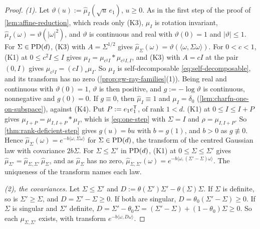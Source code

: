 \begin{proof}
\leanok
\emph{(1).} Let $\vartheta(u) := \widehat\mu_I(\sqrt u\,e_1)$, $u \ge 0$. As in the first step of the proof of
\ref{lem:affine-reduction}, which reads only (K3), $\mu_I$ is rotation invariant,
$\widehat\mu_I(\omega) = \vartheta(|\omega|^2)$, and $\vartheta$ is continuous and real with $\vartheta(0) = 1$
and $|\vartheta| \le 1$. For $\Sigma \in \mathrm{PD}(d)$, (K3) with $A = \Sigma^{1/2}$ gives
$\widehat\mu_\Sigma(\omega) = \vartheta(\langle\omega,\Sigma\omega\rangle)$. For $0 < c < 1$, (K1) at
$0 \le c^2I \le I$ gives $\mu_I = \mu_{c^2I} * \mu_{c^2I,I}$, and (K3) with $A = cI$ at the pair $(0, I)$
gives $\mu_{c^2I} = (cI)_*\mu_I$. So $\mu_I$ is self-decomposable \ref{eq:self-decomposable}, and its
transform has no zero (\ref{prop:gw-ray-families}(1)). Being real and continuous with $\vartheta(0) = 1$,
$\vartheta$ is then positive, and $g := -\log\vartheta$ is continuous, nonnegative and $g(0) = 0$. If
$g \equiv 0$, then $\widehat\mu_I \equiv 1$ and $\mu_I = \delta_0$ (\ref{lem:charfn-one-on-subspace}), against
(K4). Put $P := e_1e_1^{\mathsf{T}}$, of rank $1 < d$. (K1) at $0 \le I \le I + P$ gives
$\mu_{I+P} = \mu_{I,I+P} * \mu_I$, which is \ref{eq:one-step} with $\Sigma = I$ and $\rho = \mu_{I,I+P}$. So
\ref{thm:rank-deficient-step} gives $g(u) = bu$ with $b = g(1)$, and $b > 0$ as $g \not\equiv 0$. Hence
$\widehat\mu_\Sigma(\omega) = e^{-b\langle\omega,\Sigma\omega\rangle}$ for $\Sigma \in \mathrm{PD}(d)$, the transform of
the centred Gaussian law with covariance $2b\Sigma$. For $\Sigma \le \Sigma'$ in $\mathrm{PD}(d)$, (K1) at
$0 \le \Sigma \le \Sigma'$ gives $\widehat\mu_{\Sigma'} = \widehat\mu_{\Sigma,\Sigma'}\,\widehat\mu_\Sigma$, and as
$\widehat\mu_\Sigma$ has no zero, $\widehat\mu_{\Sigma,\Sigma'}(\omega) = e^{-b\langle\omega,(\Sigma'-\Sigma)\omega\rangle}$.
The uniqueness of the transform names each law.

\emph{(2), the covariances.} Let $\Sigma \le \Sigma'$ and $D := \theta(\Sigma')\Sigma' - \theta(\Sigma)\Sigma$. If
$\Sigma$ is definite, so is $\Sigma' \ge \Sigma$, and $D = \Sigma' - \Sigma \ge 0$. If both are singular,
$D = \theta_0(\Sigma' - \Sigma) \ge 0$. If $\Sigma$ is singular and $\Sigma'$ definite,
$D = \Sigma' - \theta_0\Sigma = (\Sigma' - \Sigma) + (1 - \theta_0)\Sigma \ge 0$. So each $\mu_{\Sigma,\Sigma'}$ exists,
with transform $e^{-b\langle\omega,D\omega\rangle}$.


\end{proof}
